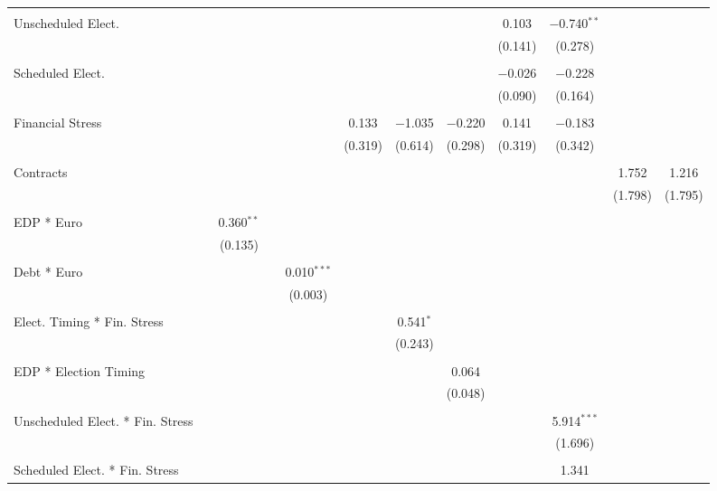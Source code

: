 \begin{table}[!htbp]
\begin{tabular}{@{\extracolsep{5pt}}lccccccccccc}
  & & & & & & & & & & & \\ 
 Unscheduled Elect. &  &  &  &  &  &  &  & 0.103 & $-$0.740$^{**}$ &  &  \\ 
  &  &  &  &  &  &  &  & (0.141) & (0.278) &  &  \\ 
  & & & & & & & & & & & \\ 
 Scheduled Elect. &  &  &  &  &  &  &  & $-$0.026 & $-$0.228 &  &  \\ 
  &  &  &  &  &  &  &  & (0.090) & (0.164) &  &  \\ 
  & & & & & & & & & & & \\ 
 Financial Stress &  &  &  &  & 0.133 & $-$1.035 & $-$0.220 & 0.141 & $-$0.183 &  &  \\ 
  &  &  &  &  & (0.319) & (0.614) & (0.298) & (0.319) & (0.342) &  &  \\ 
  & & & & & & & & & & & \\ 
 Contracts &  &  &  &  &  &  &  &  &  & 1.752 & 1.216 \\ 
  &  &  &  &  &  &  &  &  &  & (1.798) & (1.795) \\ 
  & & & & & & & & & & & \\ 
 EDP * Euro &  & 0.360$^{**}$ &  &  &  &  &  &  &  &  &  \\ 
  &  & (0.135) &  &  &  &  &  &  &  &  &  \\ 
  & & & & & & & & & & & \\ 
 Debt * Euro &  &  &  & 0.010$^{***}$ &  &  &  &  &  &  &  \\ 
  &  &  &  & (0.003) &  &  &  &  &  &  &  \\ 
  & & & & & & & & & & & \\ 
 Elect. Timing * Fin. Stress &  &  &  &  &  & 0.541$^{*}$ &  &  &  &  &  \\ 
  &  &  &  &  &  & (0.243) &  &  &  &  &  \\ 
  & & & & & & & & & & & \\ 
 EDP * Election Timing &  &  &  &  &  &  & 0.064 &  &  &  &  \\ 
  &  &  &  &  &  &  & (0.048) &  &  &  &  \\ 
  & & & & & & & & & & & \\ 
 Unscheduled Elect. * Fin. Stress &  &  &  &  &  &  &  &  & 5.914$^{***}$ &  &  \\ 
  &  &  &  &  &  &  &  &  & (1.696) &  &  \\ 
  & & & & & & & & & & & \\ 
 Scheduled Elect. * Fin. Stress &  &  &  &  &  &  &  &  & 1.341 &  &  \\ 

\end{tabular}
\end{table}
